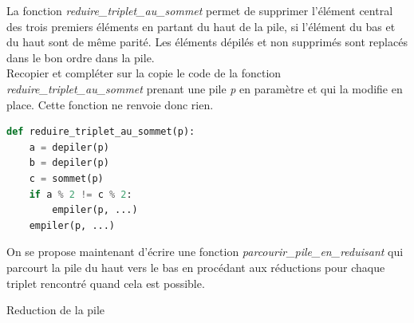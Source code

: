 \documentclass[a4paper, noanswers, addpoints, 12pt]{exam}
\begin{document}
\begin{questions}
\begin{center}
\begin{tabular}{|p{14cm}|}
\tabularnewline\hline
\end{tabular}
\end{center}

\vspace{0.5cm}

La fonction \textit{reduire\_triplet\_au\_sommet} permet de supprimer l'élément central des trois premiers éléments en partant du haut de la pile, si l'élément du bas et du haut sont de même parité. Les éléments dépilés et non supprimés sont replacés dans le bon ordre dans la pile.\\

\question[1]  Recopier et compléter sur la copie le code de la fonction \textit{reduire\_triplet\_au\_sommet} prenant une pile \textit{p} en paramètre et qui la modifie en place. Cette fonction ne renvoie donc rien.

\begin{lstlisting}[language=Python]
def reduire_triplet_au_sommet(p):
    a = depiler(p)
    b = depiler(p)
    c = sommet(p)
    if a % 2 != c % 2:
        empiler(p, ...)
    empiler(p, ...)
\end{lstlisting}

\vspace{0.5cm}

On se propose maintenant d'écrire une fonction \textit{parcourir\_pile\_en\_reduisant} qui parcourt la pile du haut vers le bas en procédant aux réductions pour chaque triplet rencontré quand cela est possible.

\question[3] Reduction de la pile


\end{questions}
\end{document}
